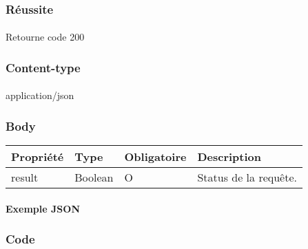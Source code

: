 	\subsubsection{Réussite}
		\paragraph{}
			Retourne code 200
			
	\subsubsection{Content-type}
		\paragraph{}
			application/json
	
	\subsubsection{Body}
		\begin{center}
			\begin{tabularx}{\textwidth}{| T{0.2122\textwidth} | S{0.22\textwidth} | S{0.15\textwidth} | S{0.3\textwidth} |}
				\hline
				Propriété & Type & Obligatoire & Description \\
				\hline
				result & Boolean & O & Status de la requête. \\
				\hline
			\end{tabularx}
		\end{center}
		
		\paragraph{Exemple JSON}
			\paragraph{}
			
			
			
	\subsubsection{Code}
		\paragraph{}
